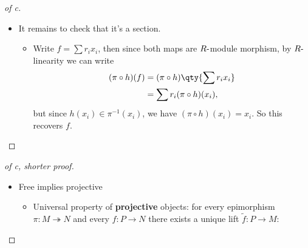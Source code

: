 \begin{solution}
\begin{proof}[of c]
\begin{center}
\end{center}

\begin{itemize}
\tightlist
\item
  It remains to check that it's a section.

  \begin{itemize}
  \tightlist
  \item
    Write \(f= \sum r_i x_i\), then since both maps are
    \(R{\hbox{-}}\)module morphism, by \(R{\hbox{-}}\)linearity we can
    write
    \begin{align*}
    (\pi \circ h)(f) 
    &= (\pi \circ h)\qty{ \sum r_i x_i } \\
    &= \sum r_i (\pi \circ h)(x_i)
    ,\end{align*}
    but since \(h(x_i) \in \pi^{-1}(x_i)\), we have
    \((\pi \circ h)(x_i) = x_i\). So this recovers \(f\).
  \end{itemize}
\end{itemize}

\end{proof}

\begin{proof}[of c, shorter proof]

\envlist

\begin{itemize}
\item
  Free implies projective

  \begin{itemize}
  \tightlist
  \item
    Universal property of \textbf{projective} objects: for every
    epimorphism \(\pi:M\twoheadrightarrow N\) and every \(f:P\to N\)
    there exists a unique lift \(\tilde f: P\to M\):
  \end{itemize}

  \begin{center}
  \end{center}


\end{itemize}
\end{proof}
\end{solution}
